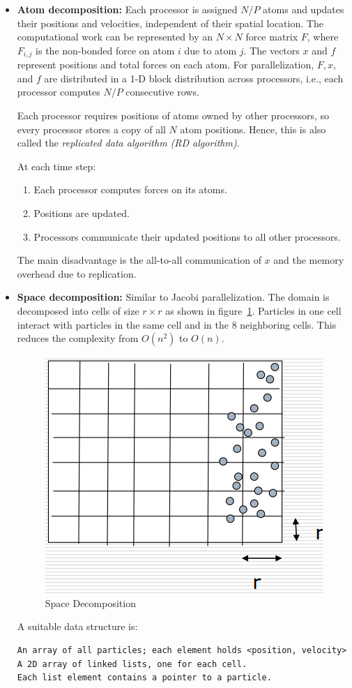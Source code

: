 \documentclass[12pt]{book}
\begin{document}
\begin{itemize}
    \item \textbf{Atom decomposition:}  
    Each processor is assigned $N/P$ atoms and updates their positions and velocities, independent of their spatial location.  
    The computational work can be represented by an $N\times N$ force matrix $F$, where $F_{i,j}$ is the non-bonded force on atom $i$ due to atom $j$.  
    The vectors $x$ and $f$ represent positions and total forces on each atom. For parallelization, $F, x,$ and $f$ are distributed in a 1-D block distribution across processors, i.e., each processor computes $N/P$ consecutive rows.  

    Each processor requires positions of atoms owned by other processors, so every processor stores a copy of all $N$ atom positions. Hence, this is also called the \textit{replicated data algorithm (RD algorithm)}.  

    At each time step:
    \begin{enumerate}
        \item Each processor computes forces on its atoms.
        \item Positions are updated.
        \item Processors communicate their updated positions to all other processors.
    \end{enumerate}
    The main disadvantage is the all-to-all communication of $x$ and the memory overhead due to replication.

    \item \textbf{Space decomposition:}  
    Similar to Jacobi parallelization. The domain is decomposed into cells of size $r \times r$ as shown in figure~\ref{fig:spacedecomp}. Particles in one cell interact with particles in the same cell and in the $8$ neighboring cells.  
    This reduces the complexity from $O(n^2)$ to $O(n)$.  
    \begin{figure}[ht]
        \centering
        \includegraphics[width=0.5\linewidth]{images/spacedecomp.png}
        \caption{Space Decomposition}
        \label{fig:spacedecomp}
    \end{figure}
    A suitable data structure is:
    \begin{lstlisting}[style=cppstyle]
An array of all particles; each element holds <position, velocity>
A 2D array of linked lists, one for each cell.
Each list element contains a pointer to a particle.


\end{lstlisting}
\end{itemize}
\end{document}
